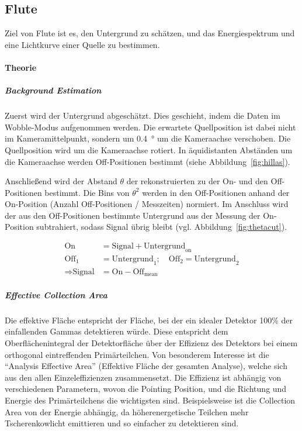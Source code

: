 \subsection{Flute}%
\label{sub:flute}

Ziel von Flute ist es,
den Untergrund zu schätzen,
und das Energiespektrum und
eine Lichtkurve einer Quelle zu bestimmen.

\paragraph{Theorie}%

\subparagraph{Background Estimation}
Zuerst wird der Untergrund abgeschätzt.
Dies geschieht, indem die Daten im Wobble-Modus aufgenommen werden.
Die erwartete Quellposition ist dabei nicht im
Kameramittelpunkt,
sondern um
\SI{0.4}{\degree} um die Kameraachse
verschoben.
Die Quellposition wird um die Kameraachse rotiert.
In äquidistanten Abständen um die Kameraachse werden Off-Positionen bestimmt
(siehe Abbildung~\ref{fig:hillas}).

Anschließend wird der Abstand $\theta$ der rekonstruierten
zu der On- und den Off-Positionen bestimmt.
Die Bins von $\theta^2$ werden in den Off-Positionen
anhand der On-Position (Anzahl Off-Positionen / Messzeiten) normiert.
Im Anschluss wird der aus den Off-Positionen bestimmte Untergrund
aus der Messung der On-Position subtrahiert, sodass Signal übrig bleibt
(vgl. Abbildung~\ref{fig:thetacut}).


\begin{align*}
  \text{On} &= \text{Signal} + \text{Untergrund}_{\text{on}} \\
  \text{Off}_{1} &= \text{Untergrund}_{1} ;
  \quad \text{Off}_{2} = \text{Untergrund}_{2} \\
  \Rightarrow \text{Signal} &= \text{On} - \text{Off}_{\text{mean}}
\end{align*}

\subparagraph{Effective Collection Area}
Die effektive Fläche entspricht der Fläche,
bei der ein idealer Detektor 100\%
der einfallenden Gammas detektieren würde.
Diese entspricht dem Oberflächenintegral der Detektorfläche
über der Effizienz des Detektors
bei einem orthogonal eintreffenden Primärteilchen.
Von besonderem Interesse ist die \enquote{Analysis Effective Area}
(Effektive Fläche der gesamten Analyse),
welche sich aus den allen Einzeleffizienzen zusammensetzt.
Die Effizienz ist abhängig von verschiedenen Parametern,
wovon die Pointing Position,
und die Richtung und Energie des Primärteilchens
die wichtigsten sind.
Beispielsweise ist die Collection Area von der Energie abhängig,
da höherenergetische Teilchen mehr Tscherenkowlicht emittieren
und so einfacher zu detektieren sind.

